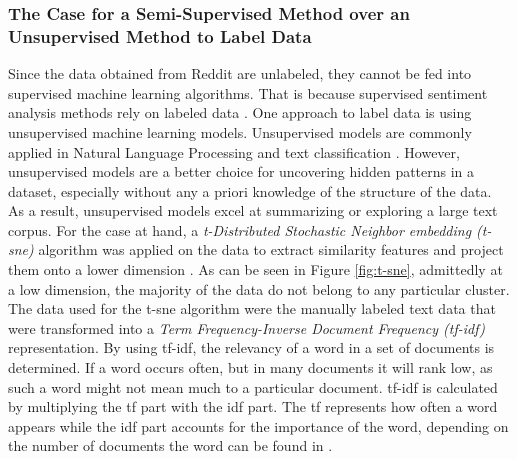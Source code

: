 \documentclass[11pt, a4paper]{article}
\begin{document}
\subsubsection{The Case for a Semi-Supervised Method over an Unsupervised Method to Label Data}
Since the data obtained from Reddit are unlabeled, they cannot be fed into supervised machine learning algorithms. 
That is because supervised sentiment analysis methods rely on labeled data \citep{sazzed2021ssentia}. One approach to label 
data is using unsupervised machine learning models. Unsupervised models are commonly applied in Natural Language Processing 
and text classification \citep{jung2019automatedclassification}. However, unsupervised models are a better choice for uncovering hidden 
patterns in a dataset, especially without any a priori knowledge of the structure of the data. As a result, unsupervised models 
excel at summarizing or exploring a large text corpus. 
For the case at hand, a \emph{t-Distributed Stochastic Neighbor embedding (t-sne)} algorithm was applied on the data to extract similarity 
features and project them onto a lower dimension \citep{binu2020dimreductiontsne}. As can be seen in Figure \ref{fig:t-sne}, admittedly 
at a low dimension, the majority of the data do not belong to any particular cluster.
The data used for the t-sne algorithm were the
manually labeled text data that were transformed into a \emph{Term Frequency-Inverse Document Frequency (tf-idf)} representation.
By using tf-idf, the relevancy of a word in a set of documents is determined. If a word occurs often, but in many documents
it will rank low, as such a word might not mean much to a particular document. tf-idf is calculated by multiplying the tf part with the
idf part. The tf represents how often a word appears while the idf part accounts for the importance of the word, depending on
the number of documents the word can be found in \citep{Guia2019ComparisonON, jason2021tfidf}.
\end{document}
